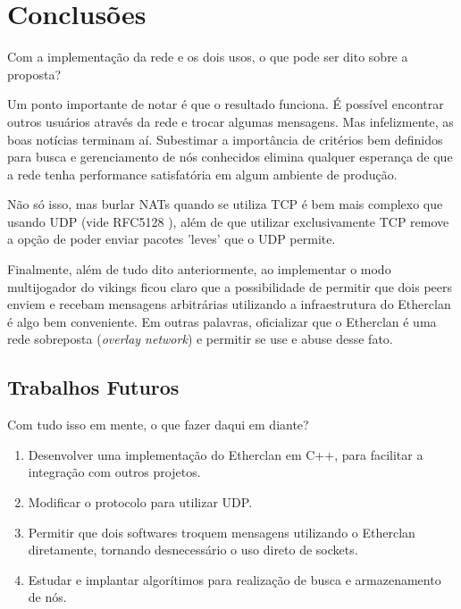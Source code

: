 \chapter{Conclusões}
\label{sec:conclusoes}

Com a implementação da rede e os dois usos, o que pode ser dito sobre a proposta?

Um ponto importante de notar é que o resultado funciona. É possível encontrar outros usuários
através da rede e trocar algumas mensagens. Mas infelizmente, as boas notícias terminam aí.
Subestimar a importância de critérios bem definidos para busca e gerenciamento de nós conhecidos
elimina qualquer esperança de que a rede tenha performance satisfatória em algum ambiente de
produção. 

Não só isso, mas burlar NATs quando se utiliza TCP é bem mais complexo que usando UDP
(vide RFC5128 \cite{rfc5128}), além de que utilizar exclusivamente TCP remove a opção de poder
enviar pacotes 'leves' que o UDP permite.

Finalmente, além de tudo dito anteriormente, ao implementar o modo multijogador do vikings ficou
claro que a possibilidade de permitir que dois peers enviem e recebam mensagens arbitrárias
utilizando a infraestrutura do Etherclan é algo bem conveniente. Em outras palavras, oficializar
que o Etherclan é uma rede sobreposta (\textit{overlay network}) e permitir se use e abuse desse
fato.

\section{Trabalhos Futuros}

  Com tudo isso em mente, o que fazer daqui em diante?

  \begin{enumerate}
    \item Desenvolver uma implementação do Etherclan em C++, para facilitar a integração com outros
      projetos.
    \item Modificar o protocolo para utilizar UDP.
    \item Permitir que dois softwares troquem mensagens utilizando o Etherclan diretamente, tornando
      desnecessário o uso direto de sockets.
    \item Estudar e implantar algorítimos para realização de busca e armazenamento de nós.
  \end{enumerate}